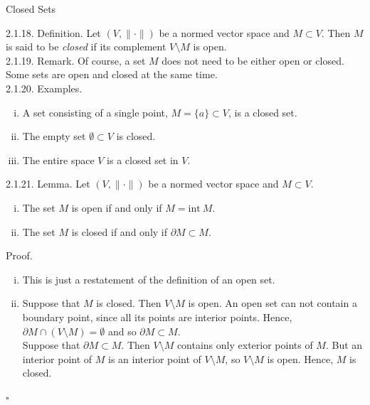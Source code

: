 \documentclass[smaller,hyperref={CJKbookmarks=true}]{beamer}
\begin{document}
\begin{frame}{Closed Sets}
\vspace*{19pt}
\begin{spacing}{1.1}
\alert{2.1.18. Definition.} Let $(V,\|\cdot\|)$ be a normed vector space and $M\subset V$. Then $M$ is said to be \emph{closed} if its complement $V\setminus M$ is open.\\[5pt]
\alert{2.1.19. Remark.} Of course, a set $M$ does not need to be either open or closed. Some sets are open and closed at the same time.\\[5pt]
\alert{2.1.20. Examples.}
\begin{enumerate}[(i)]
  \item A set consisting of a single point, $M=\{a\}\subset V$, is a closed set.
  \item The empty set $\emptyset\subset V$ is closed.
  \item The entire space $V$ is a closed set in $V$.
\end{enumerate}
\newpage
\alert{2.1.21. Lemma.} Let $(V,\|\cdot\|)$ be a normed vector space and $M\subset V$.
\begin{enumerate}[(i)]
  \item The set $M$ is open if and only if $M=\text{int}~M$.
  \item The set $M$ is closed if and only if $\partial M\subset M$.
\end{enumerate}
\vspace*{6pt}
\alert{Proof.}\\
\begin{enumerate}[(i)]
  \item This is just a restatement of the definition of an open set.
  \item Suppose that $M$ is closed. Then $V\setminus M$ is open. An open set can not contain a boundary point, since all its points are interior points. Hence, $\partial M\cap(V\setminus M)=\emptyset$ and so $\partial M\subset M$.\\[5pt]
      Suppose that $\partial M\subset M$. Then $V\setminus M$ contains only exterior points of $M$. But an interior point of $M$ is an interior point of $V\setminus M$, so $V\setminus M$ is open. Hence, $M$ is closed.
\end{enumerate}
\begin{flushright}
  $\square$
\end{flushright}
\end{spacing}
\end{frame}
\end{document}
